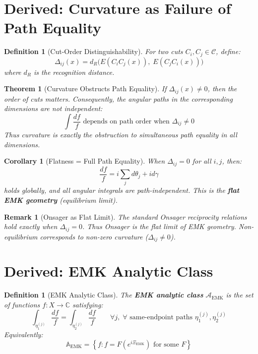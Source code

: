 \documentclass[12pt]{article}
\newtheorem{definition}[axiom]{Definition}
\newtheorem{theorem}[axiom]{Theorem}
\newtheorem{corollary}[axiom]{Corollary}
\newtheorem{remark}[axiom]{Remark}
\newcommand{\EMK}{\mathrm{EMK}}
\begin{document}
\section{Derived: Curvature as Failure of Path Equality}

\begin{definition}[Cut-Order Distinguishability]
For two cuts \(C_i, C_j \in \mathcal{C}\), define:
\[
\Delta_{ij}(x) = d_R\big(E(C_i C_j(x)),\; E(C_j C_i(x))\big)
\]
where \(d_R\) is the recognition distance.
\end{definition}

\begin{theorem}[Curvature Obstructs Path Equality]
If \(\Delta_{ij}(x) \neq 0\), then the order of cuts matters.
Consequently, the angular paths in the corresponding dimensions are not independent:
\[
\int \frac{df}{f} \text{ depends on path order when } \Delta_{ij} \neq 0
\]
Thus curvature is exactly the obstruction to simultaneous path equality in all dimensions.
\end{theorem}

\begin{corollary}[Flatness = Full Path Equality]
When \(\Delta_{ij} = 0\) for all \(i,j\), then:
\[
\frac{df}{f} = i\sum_j d\theta_j + i d\gamma
\]
holds globally, and all angular integrals are path-independent.
This is the \textbf{flat EMK geometry} (equilibrium limit).
\end{corollary}

\begin{remark}[Onsager as Flat Limit]
The standard Onsager reciprocity relations hold exactly when \(\Delta_{ij} = 0\).
Thus Onsager is the flat limit of EMK geometry.
Non-equilibrium corresponds to non-zero curvature (\(\Delta_{ij} \neq 0\)).
\end{remark}

\section{Derived: EMK Analytic Class}

\begin{definition}[EMK Analytic Class]
The \textbf{EMK analytic class} \(\mathcal{A}_{\EMK}\) is the set of functions \(f: X \to \mathbb{C}\) satisfying:
\[
\int_{\eta_1^{(j)}} \frac{df}{f} = \int_{\eta_2^{(j)}} \frac{df}{f} \qquad \forall j,\; \forall \text{ same-endpoint paths } \eta_1^{(j)}, \eta_2^{(j)}
\]
Equivalently:
\[
\mathbb{A}_{\EMK} = \left\{ f : f = F(e^{i\Xi_{\EMK}}) \text{ for some } F \right\}
\]
\end{definition}
\end{document}
